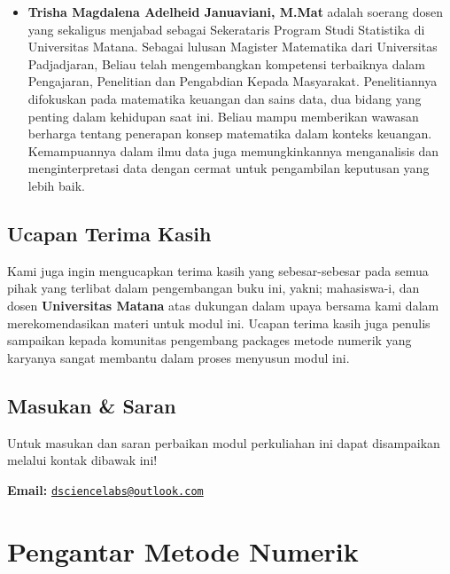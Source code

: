 \documentclass[
]{book}
\providecommand{\tightlist}{%
  \setlength{\itemsep}{0pt}\setlength{\parskip}{0pt}}
\theoremstyle{definition}
\theoremstyle{definition}
\theoremstyle{definition}
\theoremstyle{definition}
\theoremstyle{remark}
\begin{document}
\begin{itemize}
\tightlist
\item
  \textbf{Trisha Magdalena Adelheid Januaviani, M.Mat} adalah soerang dosen yang sekaligus menjabad sebagai Sekerataris Program Studi Statistika di Universitas Matana. Sebagai lulusan Magister Matematika dari Universitas Padjadjaran, Beliau telah mengembangkan kompetensi terbaiknya dalam Pengajaran, Penelitian dan Pengabdian Kepada Masyarakat. Penelitiannya difokuskan pada matematika keuangan dan sains data, dua bidang yang penting dalam kehidupan saat ini. Beliau mampu memberikan wawasan berharga tentang penerapan konsep matematika dalam konteks keuangan. Kemampuannya dalam ilmu data juga memungkinkannya menganalisis dan menginterpretasi data dengan cermat untuk pengambilan keputusan yang lebih baik.
\end{itemize}

\hypertarget{ucapan-terima-kasih}{%
\section*{Ucapan Terima Kasih}\label{ucapan-terima-kasih}}

Kami juga ingin mengucapkan terima kasih yang sebesar-sebesar pada semua pihak yang terlibat dalam pengembangan buku ini, yakni; mahasiswa-i, dan dosen \textbf{Universitas Matana} atas dukungan dalam upaya bersama kami dalam merekomendasikan materi untuk modul ini. Ucapan terima kasih juga penulis sampaikan kepada komunitas pengembang packages metode numerik yang karyanya sangat membantu dalam proses menyusun modul ini.

\hypertarget{masukan-saran}{%
\section*{Masukan \& Saran}\label{masukan-saran}}

Untuk masukan dan saran perbaikan modul perkuliahan ini dapat disampaikan melalui kontak dibawak ini!

\textbf{Email:} \href{mailto:dsciencelabs@outlook.com}{\nolinkurl{dsciencelabs@outlook.com}}

\hypertarget{pengantar-metode-numerik}{%
\chapter{Pengantar Metode Numerik}\label{pengantar-metode-numerik}}
\end{document}
